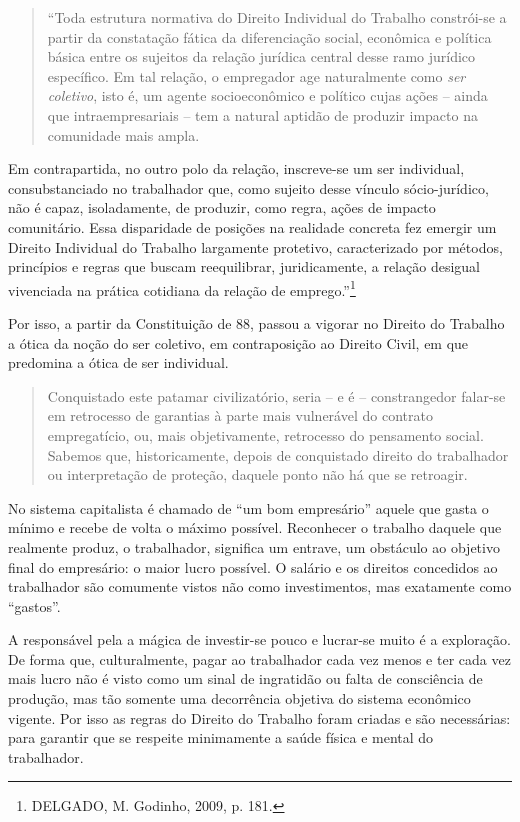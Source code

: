 \begin{quote}
``Toda estrutura normativa do Direito Individual do Trabalho constrói-se
a partir da constatação fática da diferenciação social, econômica e
política básica entre os sujeitos da relação jurídica central desse ramo
jurídico específico. Em tal relação, o empregador age naturalmente como
\emph{ser coletivo}, isto é, um agente socioeconômico e político cujas
ações -- ainda que intraempresariais -- tem a natural aptidão de
produzir impacto na comunidade mais ampla.
\end{quote}

Em contrapartida, no outro polo da relação, inscreve-se um ser
individual, consubstanciado no trabalhador que, como sujeito desse
vínculo sócio-jurídico, não é capaz, isoladamente, de produzir, como
regra, ações de impacto comunitário. Essa disparidade de posições na
realidade concreta fez emergir um Direito Individual do Trabalho
largamente protetivo, caracterizado por métodos, princípios e regras que
buscam reequilibrar, juridicamente, a relação desigual vivenciada na
prática cotidiana da relação de emprego.''\footnote{DELGADO, M. Godinho,
  2009, p. 181.}

Por isso, a partir da Constituição de 88, passou a vigorar no Direito do
Trabalho a ótica da noção do ser coletivo, em contraposição ao Direito
Civil, em que predomina a ótica de ser individual.

\begin{quote}
Conquistado este patamar civilizatório, seria -- e é -- constrangedor
falar-se em retrocesso de garantias à parte mais vulnerável do contrato
empregatício, ou, mais objetivamente, retrocesso do pensamento social.
Sabemos que, historicamente, depois de conquistado direito do
trabalhador ou interpretação de proteção, daquele ponto não há que se
retroagir.
\end{quote}

No sistema capitalista é chamado de ``um bom empresário'' aquele que
gasta o mínimo e recebe de volta o máximo possível. Reconhecer o
trabalho daquele que realmente produz, o trabalhador, significa um
entrave, um obstáculo ao objetivo final do empresário: o maior lucro
possível. O salário e os direitos concedidos ao trabalhador são
comumente vistos não como investimentos, mas exatamente como ``gastos''.

A responsável pela a mágica de investir-se pouco e lucrar-se muito é a
exploração. De forma que, culturalmente, pagar ao trabalhador cada vez
menos e ter cada vez mais lucro não é visto como um sinal de ingratidão
ou falta de consciência de produção, mas tão somente uma decorrência
objetiva do sistema econômico vigente. Por isso as regras do Direito do
Trabalho foram criadas e são necessárias: para garantir que se respeite
minimamente a saúde física e mental do trabalhador.

